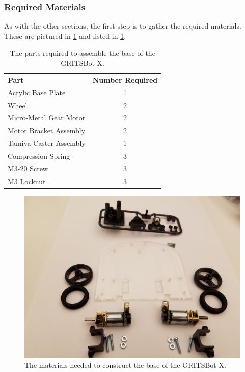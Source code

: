 \subsubsection{Required Materials}
\label{sec:baseMaterials}

As with the other sections, the first step is to gather the required materials. These are pictured in \cref{fig:baseMaterials} and listed in \cref{tab:baseMaterials}.

 \begin{table}[h!]
 \centering
\begin{tabular}{lc}
\rowcolor[HTML]{C0C0C0} 
\textbf{Part}  & \textbf{Number Required} 		\\
Acrylic Base Plate			&  1	\\
\rowcolor[HTML]{C0C0C0} 
Wheel               				& 2	\\
Micro-Metal Gear Motor	& 2	\\
\rowcolor[HTML]{C0C0C0} 
Motor Bracket Assembly	& 2   \\
Tamiya Caster Assembly	& 1	\\
\rowcolor[HTML]{C0C0C0} 
Compression Spring		& 3   \\
M3-20 Screw				& 3	\\
\rowcolor[HTML]{C0C0C0} 
M3 Locknut				& 3  
\end{tabular}
\caption{The parts required to assemble the base of the GRITSBot X. \label{tab:baseMaterials}}
\end{table}
 
\begin{figure}[h!]
\centering
\includegraphics[width=0.65\columnwidth, keepaspectratio]{./figs/20181219_104828.jpg}
\caption{The materials needed to construct the base of the GRITSBot X.}
\label{fig:baseMaterials}
\end{figure}

